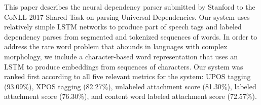 This paper describes the neural dependency parser submitted by Stanford to the CoNLL 2017 Shared Task on parsing Universal Dependencies. Our system uses relatively simple LSTM networks to produce part of speech tags and labeled dependency parses from segmented and tokenized sequences of words. In order to address the rare word problem that abounds in languages with complex morphology, we include a character-based word representation that uses an LSTM to produce embeddings from sequences of characters. Our system was ranked first according to all five relevant metrics for the system: UPOS tagging (93.09\%), XPOS tagging (82.27\%), unlabeled attachment score (81.30\%), labeled attachment score (76.30\%), and content word labeled attachment score (72.57\%).
